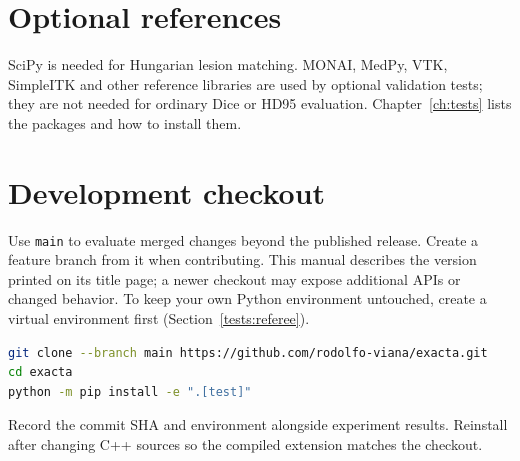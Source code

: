 \section{Optional references}\label{installation:optional-references}

SciPy is needed for Hungarian lesion matching. MONAI, MedPy, VTK, SimpleITK and other reference
libraries are used by optional validation tests; they are not needed for ordinary Dice or
HD95 evaluation. Chapter~\ref{ch:tests} lists the packages and how to install them.

\section{Development checkout}\label{installation:development-checkout}

Use \texttt{main} to evaluate merged changes beyond the published release. Create a feature branch
from it when contributing. This manual describes the version printed on its title page; a newer
checkout may expose additional APIs or changed behavior. To keep your own Python environment
untouched, create a virtual environment first (Section~\ref{tests:referee}).

\begin{lstlisting}[language=bash]
git clone --branch main https://github.com/rodolfo-viana/exacta.git
cd exacta
python -m pip install -e ".[test]"
\end{lstlisting}

Record the commit SHA and environment alongside experiment results. Reinstall after changing
C++ sources so the compiled extension matches the checkout.
